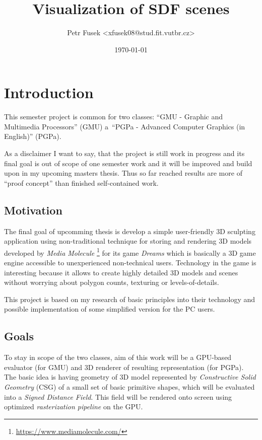 \documentclass[11pt, a4paper]{article}
\title{Visualization of SDF scenes}
\author{Petr Fusek <xfusek08@stud.fit.vutbr.cz>}
\date{\today}
\renewcommand{\uv}[1]{``#1''}
\begin{document}
\maketitle

\section{Introduction}

This semester project is common for two classes: \uv{GMU - Graphic and Multimedia Processors} (GMU) a~\uv{PGPa - Advanced Computer Graphics (in English)} (PGPa).

As a disclaimer I want to say, that the project is still work in progress and its final goal is out of scope of one semester work and it will be improved and build upon in my upcoming masters thesis.
Thus so far reached results are more of \uv{proof concept} than finished self-contained work.

\subsection{Motivation}

The final goal of upcomming thesis is develop a simple user-friendly 3D sculpting application using non-traditional technique for storing and rendering 3D models developed by \emph{Media Molecule} \footnote{\href{https://www.mediamolecule.com/}{https://www.mediamolecule.com/}} for its game \emph{Dreams}{\scriptsize\texttrademark} which is basically a 3D game engine accessible to unexperienced non-technical users.
Technology in the game is interesting because it allows to create highly detailed 3D models and scenes without worrying about polygon counts, texturing or levels-of-details.

This project is based on my research of basic principles into their technology and possible implementation of some simplified version for the PC users.

\subsection{Goals}

To stay in scope of the two classes, aim of this work will be a GPU-based evaluator (for GMU) and 3D renderer of resulting representation (for PGPa).
The basic idea is having geometry of 3D model represented by \emph{Constructive Solid Geometry} (CSG) of a small set of basic primitive shapes, which will be evaluated into a \emph{Signed Distance Field}. This field will be rendered onto screen using optimized \emph{rasterization pipeline} on the GPU.
\end{document}
